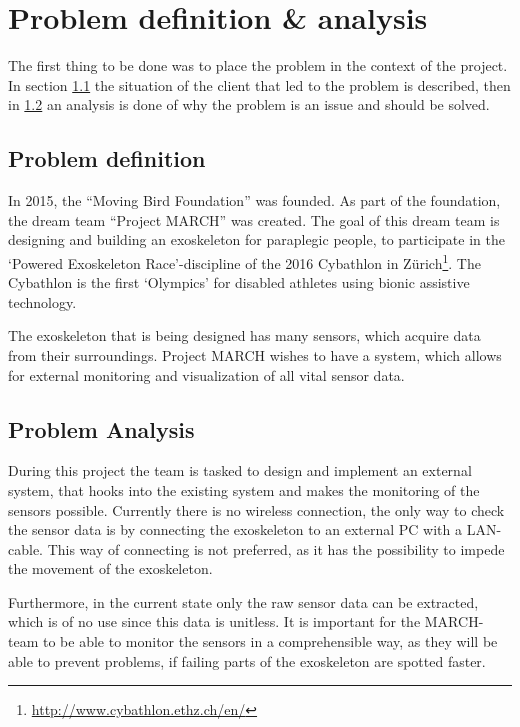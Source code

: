 \section{Problem definition \& analysis} \label{sec:probdef}
The first thing to be done was to place the problem in the context of the project. In section \ref{sec:prodef} the situation of the client that led to the problem is described, then in \ref{sec:proana} an analysis is done of why the problem is an issue and should be solved.

\subsection{Problem definition}\label{sec:prodef}
In 2015, the ``Moving Bird Foundation'' was founded. As part of the foundation, the dream team ``Project MARCH'' was created. The goal of this dream team is designing and building an exoskeleton for paraplegic people, to participate in the `Powered Exoskeleton Race'-discipline of the 2016 Cybathlon in Zürich\footnote{\url{http://www.cybathlon.ethz.ch/en/}}. The Cybathlon is the first `Olympics' for disabled athletes using bionic assistive technology.
 
The exoskeleton that is being designed has many sensors, which acquire data from their surroundings. Project MARCH wishes to have a system, which allows for external monitoring and visualization of all vital sensor data.

\subsection{Problem Analysis}\label{sec:proana}
During this project the team is tasked to design and implement an external system, that hooks into the existing system and makes the monitoring of the sensors possible. Currently there is no wireless connection, the only way to check the sensor data is by connecting the exoskeleton to an external PC with a LAN-cable. This way of connecting is not preferred, as it has the possibility to impede the movement of the exoskeleton.

Furthermore, in the current state only the raw sensor data can be extracted, which is of no use since this data is unitless. It is important for the MARCH-team to be able to monitor the sensors in a comprehensible way, as they will be able to prevent problems, if failing parts of the exoskeleton are spotted faster.